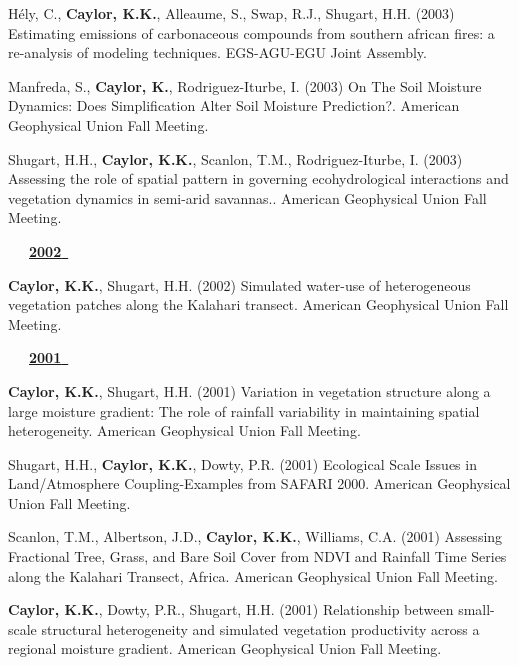 \begin{etaremune}
\item H\'ely, C., \textbf{ Caylor, K.K.}, Alleaume, S., Swap, R.J., Shugart, H.H. (2003) Estimating emissions of carbonaceous compounds from southern african fires: a re-analysis of modeling techniques. EGS-AGU-EGU Joint Assembly.
\item Manfreda, S., \textbf{ Caylor, K.}, Rodriguez-Iturbe, I. (2003) On The Soil Moisture Dynamics: Does Simplification Alter Soil Moisture Prediction?. American Geophysical Union Fall Meeting.
\item Shugart, H.H., \textbf{ Caylor, K.K.}, Scanlon, T.M., Rodriguez-Iturbe, I. (2003) Assessing the role of spatial pattern in governing ecohydrological interactions and vegetation dynamics in semi-arid savannas.. American Geophysical Union Fall Meeting.

\vspace{0.1in}
\mbox{\ \ \ \underline{\textbf{2002 }}}
\vspace{0.1in}

\item \textbf{ Caylor, K.K.}, Shugart, H.H. (2002) Simulated water-use of heterogeneous vegetation patches along the Kalahari transect. American Geophysical Union Fall Meeting.

\vspace{0.1in}
\mbox{\ \ \ \underline{\textbf{2001 }}}
\vspace{0.1in}

\item \textbf{ Caylor, K.K.}, Shugart, H.H. (2001) Variation in vegetation structure along a large moisture gradient: The role of rainfall variability in maintaining spatial heterogeneity. American Geophysical Union Fall Meeting.
\item Shugart, H.H., \textbf{ Caylor, K.K.}, Dowty, P.R. (2001) Ecological Scale Issues in Land/Atmosphere Coupling-Examples from SAFARI 2000. American Geophysical Union Fall Meeting.
\item Scanlon, T.M., Albertson, J.D., \textbf{ Caylor, K.K.}, Williams, C.A. (2001) Assessing Fractional Tree, Grass, and Bare Soil Cover from NDVI and Rainfall Time Series along the Kalahari Transect, Africa. American Geophysical Union Fall Meeting.
\item \textbf{ Caylor, K.K.}, Dowty, P.R., Shugart, H.H. (2001) Relationship between small-scale structural heterogeneity and simulated vegetation productivity across a regional moisture gradient. American Geophysical Union Fall Meeting.

\end{etaremune}
